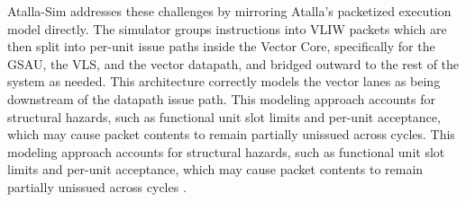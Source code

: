 Atalla-Sim addresses these challenges by mirroring Atalla’s packetized execution model directly. The simulator groups instructions into VLIW packets which are then split into per-unit issue paths inside the Vector Core, specifically for the GSAU, the VLS, and the vector datapath, and bridged outward to the rest of the system as needed. This architecture correctly models the vector lanes as being downstream of the datapath issue path. This modeling approach accounts for structural hazards, such as functional unit slot limits and per-unit acceptance, which may cause packet contents to remain partially unissued across cycles. This modeling approach accounts for structural hazards, such as functional unit slot limits and per-unit acceptance, which may cause packet contents to remain partially unissued across cycles \cite{casvliw, unifiedmethpresiverif}.